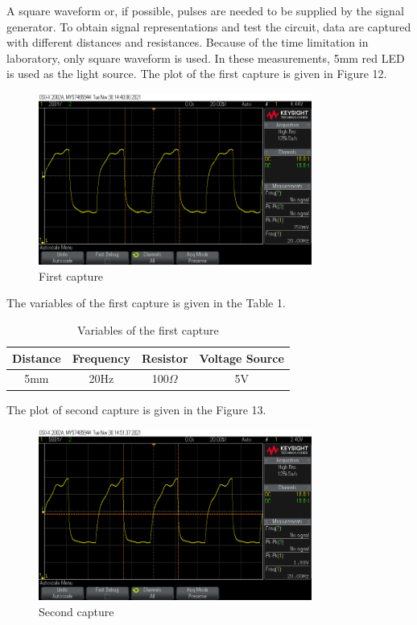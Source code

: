 \documentclass[letterpaper,12pt]{article}
\begin{document}
A square waveform or, if possible, pulses are needed to be supplied by the signal generator. 
To obtain signal representations and test the circuit,  data are captured with different distances and resistances. Because of the time limitation in laboratory, only square waveform is used. In these measurements, 5mm red LED is used as the light source.  
The plot of the first capture is given in Figure 12.
\begin{figure}[H]
	\centering
   \includegraphics[width=0.8\textwidth]{capture1_ss 0.png}
   \caption{First capture}
\end{figure} 
The variables of the first capture is given in the Table 1.
\begin{table}[H]
	\begin{center}
		\caption{Variables of the first capture}
		\vspace{2mm}
		\begin{tabular}{||c | c | c | c||} 
		 \hline
		 Distance & Frequency & Resistor & Voltage Source\\ [0.5ex] 
		 \hline\hline
		  5mm & 20Hz &  100\( \Omega \) & 5V  \\ 
		 \hline
		\end{tabular}
	\end{center}
	\end{table}
The plot of second capture is given in the Figure 13.
\begin{figure}[H]
	\centering
   \includegraphics[width=0.8\textwidth]{capture2_ss 0.png}
   \caption{Second capture}
\end{figure} 
\end{document}
